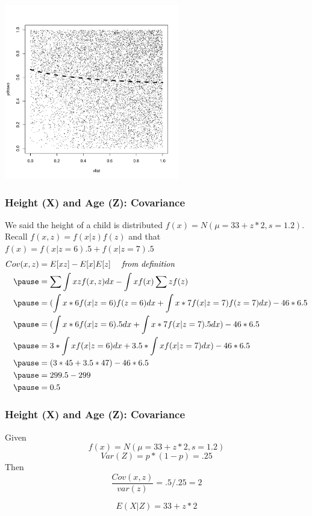 \documentclass[aspectratio=169, handout]{beamer}
\numberwithin{equation}{section}
\begin{document}
\begin{frame}
\begin{center}
\includegraphics[width=3in]{ConditionalExp1.pdf}
\end{center}
\end{frame}




\begin{frame}
\frametitle{Height (X) and Age (Z): Covariance}

We said the height of a child is distributed $f(x)=N(\mu=33+z*2, s= 1.2)$.  
Recall $f(x,z)=f(x|z)f(z)$ and that $f(x)=f(x|z=6).5+f(x|z=7).5$
\small{
\begin{align*}
Cov(x,z)&=E[xz]-E[x]E[z]  \quad \textit{ from definition}\\\pause
&=\sum\int xz f(x,z)dx- \int x f(x) \sum z f(z)\\\pause
&=(\int x*6 f(x|z=6)f(z=6)dx+\int x*7 f(x|z=7)f(z=7)dx)- 46*6.5\\\pause
&=(\int x*6 f(x|z=6).5dx+\int x*7 f(x|z=7).5dx)- 46*6.5\\\pause
&=3*\int x f(x|z=6)dx+3.5*\int x f(x|z=7)dx)- 46*6.5\\\pause
&=(3*45+3.5*47)- 46*6.5\\\pause
&=299.5-299\\\pause
&=0.5
\end{align*}}
\end{frame}

\begin{frame}
\frametitle{Height (X) and Age (Z): Covariance}

Given  $$f(x)=N(\mu=33+z*2, s= 1.2)$$
$$Var(Z)=p*(1-p)=.25$$
Then $$\frac{Cov(x,z)}{var(z)}=.5/.25=2$$\pause

$$E(X|Z)=33+z*2$$

\end{frame}
\end{document}
